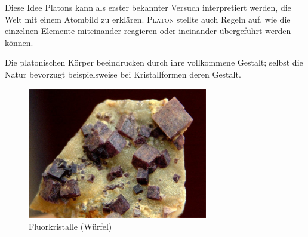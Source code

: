 \documentclass[%
11pt,%
twoside,%
titlepage,%
a4page,%
german,%
headsepline%
]{scrartcl}
\begin{document}
Diese Idee Platons kann als erster bekannter Versuch interpretiert werden, die Welt mit einem Atombild zu erkl\"aren. \textsc{Platon} stellte auch Regeln auf, wie die einzelnen Elemente miteinander reagieren oder ineinander \"ubergef\"uhrt werden k\"onnen.

Die platonischen K\"orper beeindrucken durch ihre vollkommene Gestalt; selbst die Natur bevorzugt beispielsweise bei Kristallformen deren Gestalt.
\begin{figure}
\begin{center}
\includegraphics[width=0.7\textwidth]{pictures/kristallh}
\end{center}
\caption{Fluorkristalle (W\"urfel)}
\end{figure}
\end{document}
